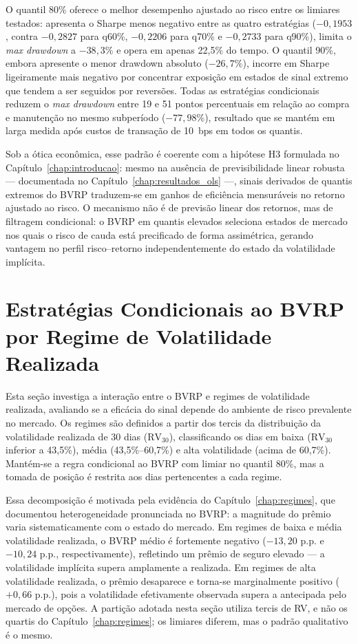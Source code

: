O quantil 80\% oferece o melhor desempenho ajustado ao risco
entre os limiares testados: apresenta o Sharpe menos negativo
entre as quatro estratégias ($-0{,}1953$, contra $-0{,}2827$ para q60\%,
$-0{,}2206$ para q70\% e $-0{,}2733$ para q90\%), limita o
\textit{max drawdown} a $-38{,}3\%$ e opera em apenas 22{,}5\% do tempo.
O quantil 90\%, embora apresente o menor drawdown absoluto ($-26{,}7\%$),
incorre em Sharpe ligeiramente mais negativo por concentrar exposição em
estados de sinal extremo que tendem a ser seguidos por reversões. Todas as
estratégias condicionais reduzem o \textit{max drawdown} entre 19 e 51
pontos percentuais em relação ao compra e manutenção no mesmo subperíodo
($-77{,}98\%$), resultado que se mantém em larga medida após
custos de transação de 10~bps em todos os quantis.

Sob a ótica econômica, esse padrão é coerente com a hipótese H3 formulada no
Capítulo~\ref{chap:introducao}: mesmo na ausência de previsibilidade linear
robusta --- documentada no Capítulo~\ref{chap:resultados_ols} ---, sinais
derivados de quantis extremos do BVRP traduzem-se em ganhos de eficiência
mensuráveis no retorno ajustado ao risco. O mecanismo não é de previsão
linear dos retornos, mas de filtragem condicional: o BVRP em quantis elevados
seleciona estados de mercado nos quais o risco de cauda está precificado de
forma assimétrica, gerando vantagem no perfil risco--retorno independentemente
do estado da volatilidade implícita.


\section{Estratégias Condicionais ao BVRP por Regime de Volatilidade Realizada}
\label{sec:cap7_bvrp_regimes}

Esta seção investiga a interação entre o BVRP e regimes de volatilidade realizada,
avaliando se a eficácia do sinal depende do ambiente de risco prevalente no mercado.
Os regimes são definidos a partir dos tercis da distribuição da volatilidade realizada de 30 dias ($\text{RV}_{30}$), classificando os dias em baixa ($\text{RV}_{30}$ inferior a 43,5\%), média (43,5\%--60,7\%) e alta volatilidade (acima de 60,7\%). Mantém-se
a regra condicional ao BVRP com limiar no quantil 80\%, mas a tomada de posição é
restrita aos dias pertencentes a cada regime.

Essa decomposição é motivada pela evidência do Capítulo~\ref{chap:regimes}, que
documentou heterogeneidade pronunciada no BVRP: a magnitude do prêmio varia
sistematicamente com o estado do mercado. Em regimes de baixa e média
volatilidade realizada, o BVRP médio é fortemente negativo ($-13{,}20$ p.p. e
$-10{,}24$ p.p., respectivamente), refletindo um prêmio de seguro elevado --- a
volatilidade implícita supera amplamente a realizada. Em regimes de alta
volatilidade realizada, o prêmio desaparece e torna-se marginalmente positivo
($+0{,}66$ p.p.), pois a volatilidade efetivamente observada supera a
antecipada pelo mercado de opções. A partição adotada nesta seção utiliza
tercis de RV, e não os quartis do Capítulo~\ref{chap:regimes}; os limiares
diferem, mas o padrão qualitativo é o mesmo.

